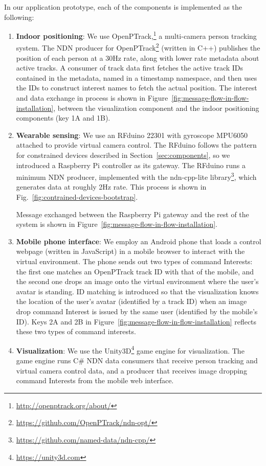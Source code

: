 In our application prototype, each of the components is implemented as the following:
\begin{enumerate}
\item \textbf{Indoor positioning}: We use OpenPTrack,\footnote{\url{http://openptrack.org/about/}} a multi-camera person tracking system.
The NDN producer for OpenPTrack\footnote{\url{https://github.com/OpenPTrack/ndn-opt/}} (written in C++) publishes the position of each person at a 30Hz rate, along with lower rate metadata about active tracks. 
A consumer of track data first fetches the active track IDs contained in the metadata, named in a timestamp namespace, and then uses the IDs to construct interest names to fetch the actual position.
The interest and data exchange in process is shown in Figure~\ref{fig:message-flow-in-flow-installation}, between the visualization component and the indoor positioning components (key 1A and 1B).
\item \textbf{Wearable sensing}: We use an RFduino 22301 with gyroscope MPU6050 attached to provide virtual camera control. 
The RFduino follows the pattern for constrained devices described in Section~\ref{sec:components}, so we introduced a Raspberry Pi controller as its gateway.
The RFduino runs a minimum NDN producer, implemented with the ndn-cpp-lite library\footnote{\url{https://github.com/named-data/ndn-cpp/}}, which generates data at roughly 2Hz rate.
This process is shown in Fig.~\ref{fig:contrained-devices-bootstrap}.

Message exchanged between the Raspberry Pi gateway and the rest of the system is shown in Figure~\ref{fig:message-flow-in-flow-installation}.
\item \textbf{Mobile phone interface}: We employ an Android phone that loads a control webpage (written in JavaScript) in a mobile browser to interact with the virtual environment. 
The phone sends out two types of command Interests: the first one matches an OpenPTrack track ID with that of the mobile, and the second one drops an image onto the virtual environment where the user's avatar is standing. 
ID matching is introduced so that the visualization knows the location of the user's avatar (identified by a track ID) when an image drop command Interest is issued by the same user (identified by the mobile's ID).
Keys 2A and 2B in Figure~\ref{fig:message-flow-in-flow-installation} reflects these two types of command interests.
\item \textbf{Visualization}: We use the Unity3D\footnote{\url{https://unity3d.com}} game engine for visualization.
The game engine runs C\# NDN data consumers that receive person tracking and virtual camera control data, and a producer that receives image dropping command Interests from the mobile web interface.
\end{enumerate}

